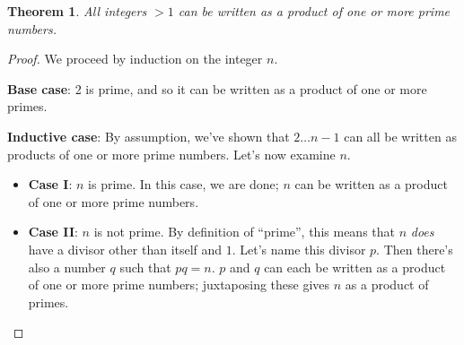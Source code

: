 \documentclass{article}
\newtheorem{theorem}{Theorem}
\begin{document}
\begin{theorem}
All integers $> 1$ can be written as a product of one or more prime numbers.
\end{theorem}

\begin{proof}

We proceed by induction on the integer $n$.

\textbf{Base case}:
2 is prime, and so it can be written as a product of one or more primes.

\textbf{Inductive case}:
By assumption, we've shown that $2 \ldots n - 1$ can all be written as products of one or more prime numbers.
Let's now examine $n$.

\begin{itemize}

\item
\textbf{Case I}: $n$ is prime.
In this case, we are done; $n$ can be written as a product of one or more prime numbers.

\item
\textbf{Case II}: $n$ is not prime.
By definition of ``prime'', this means that $n$ \textit{does} have a divisor other than itself and $1$.
Let's name this divisor $p$.
Then there's also a number $q$ such that $p q = n$.
$p$ and $q$ can each be written as a product of one or more prime numbers; juxtaposing these gives $n$ as a product of primes.

\end{itemize}

\end{proof}
\end{document}
